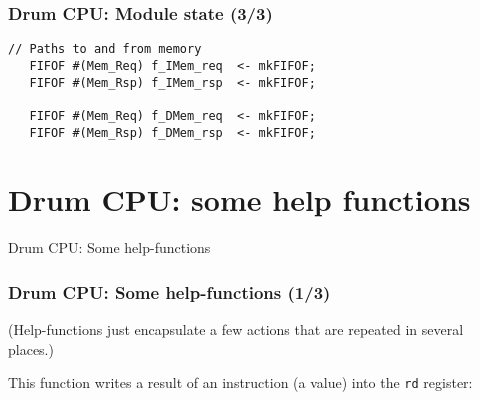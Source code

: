 
\begin{frame}[fragile]
\frametitle{Drum CPU: Module state (3/3)}

\footnotesize

\begin{minipage}{0.725\textwidth}
\begin{Verbatim}[frame=single, label=From src\_Drum/CPU.bsv]
   // Paths to and from memory
   FIFOF #(Mem_Req) f_IMem_req  <- mkFIFOF;
   FIFOF #(Mem_Rsp) f_IMem_rsp  <- mkFIFOF;

   FIFOF #(Mem_Req) f_DMem_req  <- mkFIFOF;
   FIFOF #(Mem_Rsp) f_DMem_rsp  <- mkFIFOF;
\end{Verbatim}
\end{minipage}

\end{frame}


\section{Drum CPU: some help functions}

\begin{frame}[fragile]

\begin{center}
  {\LARGE Drum CPU: Some help-functions}
\end{center}

\end{frame}


\begin{frame}[fragile]
\frametitle{Drum CPU: Some help-functions (1/3)}

\footnotesize

(Help-functions just encapsulate a few actions that are repeated in several places.)

\vspace{5ex}

This function writes a result of an instruction (a value) into the {\tt rd} register:

\vspace{4ex}

\begin{minipage}{0.725\textwidth}
\end{minipage}

\end{frame}

